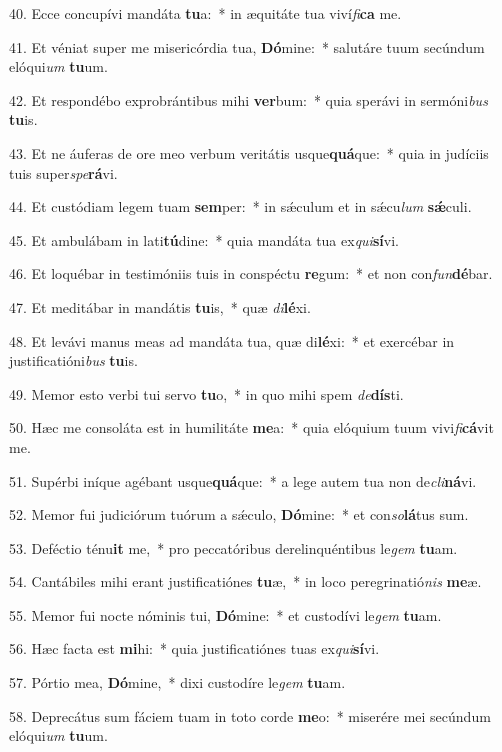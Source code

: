 40. Ecce concupívi mandáta \textbf{tu}a:~*  in æquitáte tua viví\textit{fi}\textbf{ca} me.\

41. Et véniat super me misericórdia tua, \textbf{Dó}mine:~*  salutáre tuum secúndum elóqui\textit{um} \textbf{tu}um.\

42. Et respondébo exprobrántibus mihi \textbf{ver}bum:~*  quia sperávi in sermóni\textit{bus} \textbf{tu}is.\

43. Et ne áuferas de ore meo verbum veritátis usque\textbf{quá}que:~*  quia in judíciis tuis super\textit{spe}\textbf{rá}vi.\

44. Et custódiam legem tuam \textbf{sem}per:~*  in sǽculum et in sǽcu\textit{lum} \textbf{sǽ}culi.\

45. Et ambulábam in lati\textbf{tú}dine:~*  quia mandáta tua ex\textit{qui}\textbf{sí}vi.\

46. Et loquébar in testimóniis tuis in conspéctu \textbf{re}gum:~*  et non con\textit{fun}\textbf{dé}bar.\

47. Et meditábar in mandátis \textbf{tu}is,~*  quæ \textit{di}\textbf{lé}xi.\

48. Et levávi manus meas ad mandáta tua, quæ di\textbf{lé}xi:~*  et exercébar in justificatióni\textit{bus} \textbf{tu}is.\

49. Memor esto verbi tui servo \textbf{tu}o,~*  in quo mihi spem \textit{de}\textbf{dís}ti.\

50. Hæc me consoláta est in humilitáte \textbf{me}a:~*  quia elóquium tuum vivi\textit{fi}\textbf{cá}vit me.\

51. Supérbi iníque agébant usque\textbf{quá}que:~*  a lege autem tua non de\textit{cli}\textbf{ná}vi.\

52. Memor fui judiciórum tuórum a sǽculo, \textbf{Dó}mine:~*  et con\textit{so}\textbf{lá}tus sum.\

53. Deféctio ténu\textbf{it} me,~*  pro peccatóribus derelinquéntibus le\textit{gem} \textbf{tu}am.\

54. Cantábiles mihi erant justificatiónes \textbf{tu}æ,~*  in loco peregrinatió\textit{nis} \textbf{me}æ.\

55. Memor fui nocte nóminis tui, \textbf{Dó}mine:~*  et custodívi le\textit{gem} \textbf{tu}am.\

56. Hæc facta est \textbf{mi}hi:~*  quia justificatiónes tuas ex\textit{qui}\textbf{sí}vi.\

57. Pórtio mea, \textbf{Dó}mine,~*  dixi custodíre le\textit{gem} \textbf{tu}am.\

58. Deprecátus sum fáciem tuam in toto corde \textbf{me}o:~*  miserére mei secúndum elóqui\textit{um} \textbf{tu}um.\

